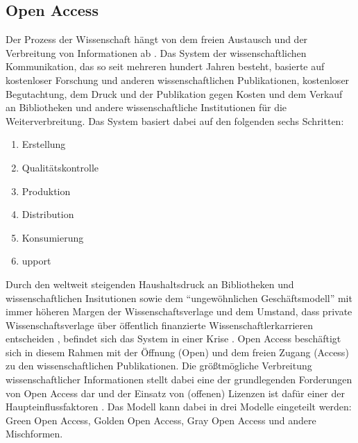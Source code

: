\subsection{Open Access} 
Der Prozess der Wissenschaft hängt von dem freien Austausch und der Verbreitung von Informationen ab . Das System der wissenschaftlichen Kommunikation, das so seit mehreren hundert Jahren besteht, basierte auf kostenloser Forschung und anderen wissenschaftlichen Publikationen, kostenloser Begutachtung, dem Druck und der Publikation gegen Kosten und dem Verkauf an Bibliotheken und andere wissenschaftliche Institutionen für die Weiterverbreitung. Das System basiert dabei auf den folgenden sechs Schritten:
\begin{enumerate}
\item Erstellung
\item Qualitätskontrolle
\item Produktion
\item Distribution
\item Konsumierung
\item upport
\end{enumerate}
Durch den weltweit steigenden Haushaltsdruck an Bibliotheken und wissenschaftlichen Insitutionen sowie dem “ungewöhnlichen Geschäftsmodell”  mit immer höheren Margen der Wissenschaftsverlage und dem Umstand, dass private Wissenschaftsverlage über öffentlich finanzierte Wissenschaftlerkarrieren entscheiden , befindet sich das System in einer Krise . Open Access beschäftigt sich in diesem Rahmen mit der Öffnung (Open) und dem freien Zugang (Access) zu den wissenschaftlichen Publikationen. Die größtmögliche Verbreitung wissenschaftlicher Informationen stellt dabei eine der grundlegenden Forderungen von Open Access dar  und der Einsatz von (offenen) Lizenzen ist dafür einer der Haupteinflussfaktoren . Das Modell kann dabei in drei Modelle eingeteilt werden: Green Open Access, Golden Open Access, Gray Open Access und andere Mischformen.
